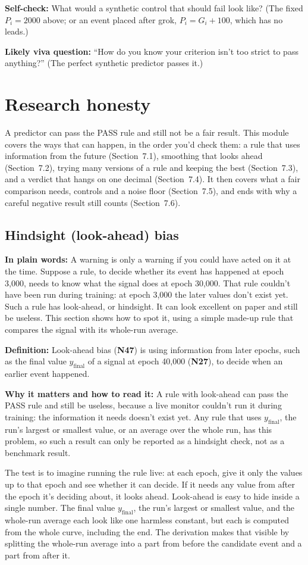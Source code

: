 \documentclass[11pt,a4paper,oneside,openany]{report}
\newcommand{\yfinal}{y_{\mathrm{final}}}
\newcommand{\gl}[1]{\textbf{#1}}   %
\newcommand{\fplain}{\textbf{In plain words:} }
\newcommand{\fdef}{\textbf{Definition:} }
\newcommand{\fread}{\par\textbf{Why it matters and how to read it:} }
\newcommand{\fself}{\par\textbf{Self-check:} }
\newcommand{\fviva}{\par\textbf{Likely viva question:} }
\begin{document}
\fself What would a synthetic control that should fail look like? (The fixed $P_i = 2000$ above; or an event placed after grok, $P_i = G_i + 100$, which has no leads.)
\fviva ``How do you know your criterion isn't too strict to pass anything?'' (The perfect synthetic predictor passes it.)

\chapter{Research honesty}

A predictor can pass the PASS rule and still not be a fair result. This module covers the ways that can happen, in the order you'd check them: a rule that uses information from the future (Section~7.1), smoothing that looks ahead (Section~7.2), trying many versions of a rule and keeping the best (Section~7.3), and a verdict that hangs on one decimal (Section~7.4). It then covers what a fair comparison needs, controls and a noise floor (Section~7.5), and ends with why a careful negative result still counts (Section~7.6).

\section{Hindsight (look-ahead) bias}
\fplain A warning is only a warning if you could have acted on it at the time. Suppose a rule, to decide whether its event has happened at epoch 3{,}000, needs to know what the signal does at epoch 30{,}000. That rule couldn't have been run during training: at epoch 3{,}000 the later values don't exist yet. Such a rule has look-ahead, or hindsight. It can look excellent on paper and still be useless. This section shows how to spot it, using a simple made-up rule that compares the signal with its whole-run average.

\fdef Look-ahead bias (\gl{N47}) is using information from later epochs, such as the final value $\yfinal$ of a signal at epoch 40{,}000 (\gl{N27}), to decide when an earlier event happened.
\fread A rule with look-ahead can pass the PASS rule and still be useless, because a live monitor couldn't run it during training: the information it needs doesn't exist yet. Any rule that uses $\yfinal$, the run's largest or smallest value, or an average over the whole run, has this problem, so such a result can only be reported as a hindsight check, not as a benchmark result.

The test is to imagine running the rule live: at each epoch, give it only the values up to that epoch and see whether it can decide. If it needs any value from after the epoch it's deciding about, it looks ahead. Look-ahead is easy to hide inside a single number. The final value $\yfinal$, the run's largest or smallest value, and the whole-run average each look like one harmless constant, but each is computed from the whole curve, including the end. The derivation makes that visible by splitting the whole-run average into a part from before the candidate event and a part from after it.
\end{document}
